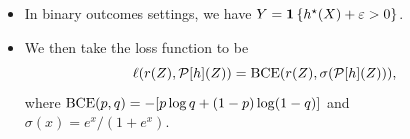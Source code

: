 \documentclass[
    a0paper,
    portrait,
    margin=3cm,
]{baposter}
\theoremstyle{fancy} %
\theoremstyle{regular}
\begin{document}
\begin{poster}
{}

{
    \begin{itemize}[noitemsep]
        \item In binary outcomes settings, we have $ Y = \mathbf{1} \left\{ h^{ \star } ( X ) + \varepsilon > 0 \right\} $.
        \item We then take the loss function to be
        \vspace{-5pt}
        $$ \ell ( r(Z), \mathcal{P} [ h ] ( Z ) ) = \operatorname{BCE} ( r(Z), \sigma ( \mathcal{P} [ h ] ( Z ) ) ), $$
        where $ \operatorname{BCE} ( p, q ) = - [ p \log q + ( 1 - p ) \log ( 1 - q ) ] $ and \\ $ \sigma ( x ) = e^{ x } / ( 1 + e^{ x } ) $.

    \end{itemize}
}


\end{poster}
\end{document}
